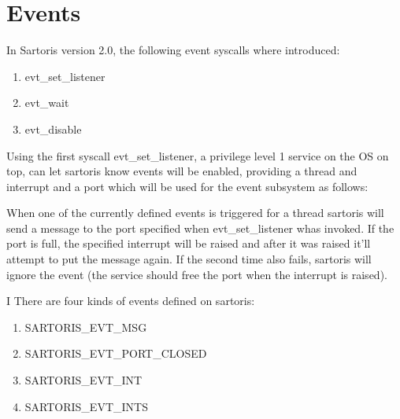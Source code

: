 \documentclass[11pt, letterpaper, twoside, english]{book}
\begin{document}
\section{Events} \label{sec:events}

In Sartoris version 2.0, the following event syscalls where introduced:

\begin{enumerate}
\item[] \textsf{evt\_set\_listener}
\item[] \textsf{evt\_wait}
\item[] \textsf{evt\_disable}
\end{enumerate}

Using the first syscall \textsf{evt\_set\_listener}, a privilege level 1 service on the OS on top, can let sartoris know events will be enabled, providing a thread and interrupt and a port which will be used for the event subsystem as follows:

When one of the currently defined events is triggered for a thread sartoris will send a message to the port specified when \textsf{evt\_set\_listener} whas invoked. If the port is full, the specified interrupt will be raised and after it was raised it'll attempt to put the message again. If the second time also fails, sartoris will ignore the event (the service should free the port when the interrupt is raised).

I
There are four kinds of events defined on sartoris:

\begin{enumerate}
\item[] \textsf{SARTORIS\_EVT\_MSG} 
\item[] \textsf{SARTORIS\_EVT\_PORT\_CLOSED}
\item[] \textsf{SARTORIS\_EVT\_INT}
\item[] \textsf{SARTORIS\_EVT\_INTS}
\end{enumerate}
\end{document}
